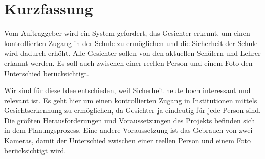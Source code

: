 %
%
\newpage

%
%
\section*{Kurzfassung}


\color{black} 
\begin{flushleft}
Vom Auftraggeber wird ein System gefordert, das Gesichter erkennt, um einen kontrollierten Zugang in der Schule zu ermöglichen und die Sicherheit der Schule wird dadurch erhöht. Alle Gesichter sollen von den aktuellen Schülern und Lehrer erkannt werden. Es soll auch zwischen einer reellen Person und einem Foto den Unterschied berücksichtigt.

Wir sind für diese Idee entschieden, weil Sicherheit heute hoch interessant und relevant ist. Es geht hier um einen kontrollierten Zugang in Institutionen mittels Gesichtserkennung zu ermöglichen, da Gesichter ja eindeutig für jede Person sind. Die größten Herausforderungen und Voraussetzungen des Projekts befinden sich in dem Planungsprozess. Eine andere Voraussetzung ist das Gebrauch von zwei Kameras, damit der Unterschied zwischen einer reellen Person und einem Foto berücksichtigt wird.
\end{flushleft}


\color{black} 
